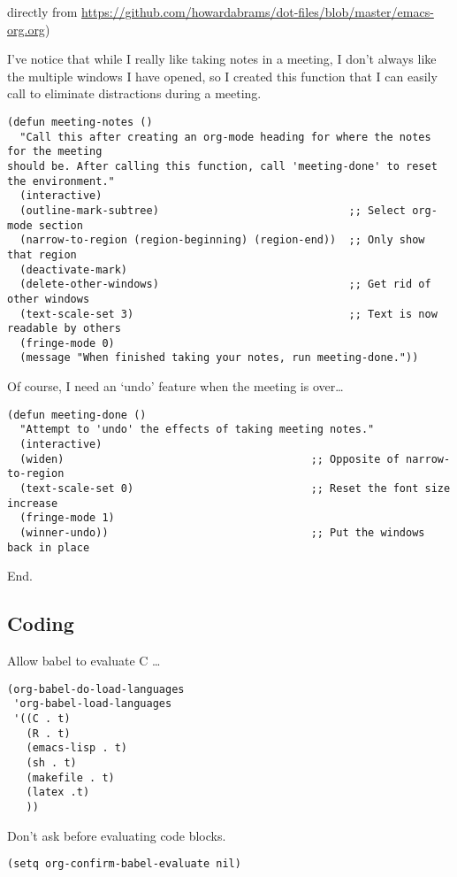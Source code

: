 \documentclass[12pt]{article}
\begin{document}
directly from \url{https://github.com/howardabrams/dot-files/blob/master/emacs-org.org})

I’ve notice that while I really like taking notes in a meeting, I don’t always like the multiple windows I have opened, so I created this function that I can easily call to eliminate distractions during a meeting.
\lstset{language=Lisp,label= ,caption= ,numbers=none}
\begin{lstlisting}
(defun meeting-notes ()
  "Call this after creating an org-mode heading for where the notes for the meeting
should be. After calling this function, call 'meeting-done' to reset the environment."
  (interactive)
  (outline-mark-subtree)                              ;; Select org-mode section
  (narrow-to-region (region-beginning) (region-end))  ;; Only show that region
  (deactivate-mark)
  (delete-other-windows)                              ;; Get rid of other windows
  (text-scale-set 3)                                  ;; Text is now readable by others
  (fringe-mode 0)
  (message "When finished taking your notes, run meeting-done."))
\end{lstlisting}
Of course, I need an ‘undo’ feature when the meeting is over…
\lstset{language=Lisp,label= ,caption= ,numbers=none}
\begin{lstlisting}
(defun meeting-done ()
  "Attempt to 'undo' the effects of taking meeting notes."
  (interactive)
  (widen)                                       ;; Opposite of narrow-to-region
  (text-scale-set 0)                            ;; Reset the font size increase
  (fringe-mode 1)
  (winner-undo))                                ;; Put the windows back in place
\end{lstlisting}

End.

\subsection{Coding}
\label{sec-5-4}

Allow babel to evaluate C \ldots{}

\lstset{language=Lisp,label= ,caption= ,numbers=none}
\begin{lstlisting}
(org-babel-do-load-languages
 'org-babel-load-languages
 '((C . t)
   (R . t)
   (emacs-lisp . t)
   (sh . t) 
   (makefile . t)
   (latex .t)
   ))
\end{lstlisting}

Don’t ask before evaluating code blocks.
\lstset{language=Lisp,label= ,caption= ,numbers=none}
\begin{lstlisting}
(setq org-confirm-babel-evaluate nil)
\end{lstlisting}
\end{document}
